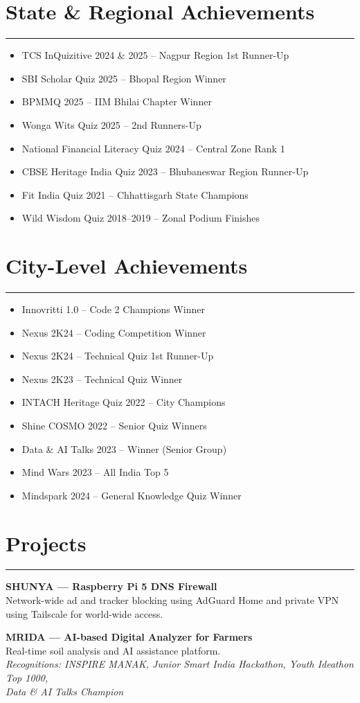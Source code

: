 \documentclass[11pt,a4paper]{article}
\newcommand{\resumesection}[1]{
  \section*{#1}
  \vspace{-4pt}
  \hrule
  \vspace{5pt}
}
\begin{document}
\resumesection{State \& Regional Achievements}
\begin{itemize}
\item TCS InQuizitive 2024 \& 2025 – Nagpur Region 1st Runner-Up
\item SBI Scholar Quiz 2025 – Bhopal Region Winner
\item BPMMQ 2025 – IIM Bhilai Chapter Winner
\item Wonga Wits Quiz 2025 – 2nd Runners-Up
\item National Financial Literacy Quiz 2024 – Central Zone Rank 1
\item CBSE Heritage India Quiz 2023 – Bhubaneswar Region Runner-Up
\item Fit India Quiz 2021 – Chhattisgarh State Champions
\item Wild Wisdom Quiz 2018–2019 – Zonal Podium Finishes
\end{itemize}

\resumesection{City-Level Achievements}
\begin{itemize}
\item Innovritti 1.0 – Code 2 Champions Winner
\item Nexus 2K24 – Coding Competition Winner
\item Nexus 2K24 – Technical Quiz 1st Runner-Up
\item Nexus 2K23 – Technical Quiz Winner
\item INTACH Heritage Quiz 2022 – City Champions
\item Shine COSMO 2022 – Senior Quiz Winners
\item Data \& AI Talks 2023 – Winner (Senior Group)
\item Mind Wars 2023 – All India Top 5
\item Mindspark 2024 – General Knowledge Quiz Winner
\end{itemize}

\resumesection{Projects}

\begin{tcolorbox}[resumebox]
\textbf{SHUNYA — Raspberry Pi 5 DNS Firewall}\\
Network-wide ad and tracker blocking using AdGuard Home and private VPN using Tailscale for world-wide access.
\end{tcolorbox}

\begin{tcolorbox}[resumebox]
\textbf{MRIDA — AI-based Digital Analyzer for Farmers}\\
Real-time soil analysis and AI assistance platform.\\
\emph{Recognitions: INSPIRE MANAK, Junior Smart India Hackathon, Youth Ideathon Top 1000,\\Data \& AI Talks Champion}
\end{tcolorbox}
\end{document}
